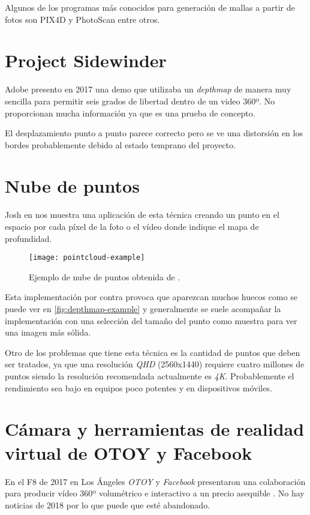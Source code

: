 Algunos de los programas más conocidos para generación de mallas a partir de fotos son PIX4D y PhotoScan entre otros.


\section{Project Sidewinder}
Adobe presento en 2017 \cite{SidewinderAdobe} una demo que utilizaba un \textit{depthmap} de manera muy sencilla para permitir seis grados de libertad dentro de un video 360º. No proporcionan mucha información ya que es una prueba de concepto.

El desplazamiento punto a punto parece correcto pero se ve una distorsión en los bordes probablemente debido al estado temprano del proyecto.

\section{Nube de puntos}
Josh en \cite{Josh6DoFUnity} nos muestra una aplicación de esta técnica creando un punto en el espacio por cada píxel de la foto o el vídeo donde indique el mapa de profundidad.

\begin{figure}[h]
  \centering
  \texttt{[image: pointcloud-example]}
  \caption{Ejemplo de nube de puntos obtenida de \cite{Josh6DoFUnity}.}
  \label{fig:pointcloud-example}
\end{figure}

Esta implementación por contra provoca que aparezcan muchos huecos como se puede ver en \ref{fig:depthmap-example} y generalmente se suele acompañar la implementación con una selección del tamaño del punto como muestra \cite{Josh6DoFUnity} para ver una imagen más sólida.

Otro de los problemas que tiene esta técnica es la cantidad de puntos que deben ser tratados, ya que una resolución \textit{QHD} (2560x1440) requiere cuatro millones de puntos siendo la resolución recomendada actualmente es \textit{4K}. Probablemente el rendimiento sea bajo en equipos poco potentes y en dispositivos móviles.

\section{Cámara y herramientas de realidad virtual de OTOY y Facebook}

En el F8 de 2017 en Los Ángeles \textit{OTOY} y \textit{Facebook} presentaron una colaboración para producir vídeo 360º volumétrico e interactivo a un precio asequible \cite{OtoyVR}. No hay noticias de 2018 por lo que puede que esté abandonado.

